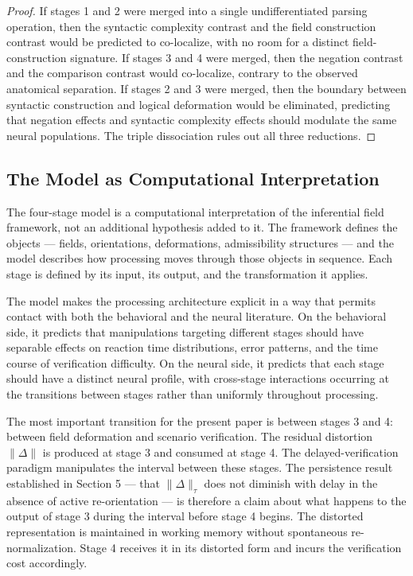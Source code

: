 \documentclass[12pt]{article}
\theoremstyle{remark}
\begin{document}
\begin{proof}
If stages 1 and 2 were merged into a single undifferentiated parsing
operation, then the syntactic complexity contrast and the field
construction contrast would be predicted to co-localize, with no room
for a distinct field-construction signature. If stages 3 and 4 were
merged, then the negation contrast and the comparison contrast would
co-localize, contrary to the observed anatomical separation. If stages
2 and 3 were merged, then the boundary between syntactic construction
and logical deformation would be eliminated, predicting that negation
effects and syntactic complexity effects should modulate the same
neural populations. The triple dissociation rules out all three
reductions.
\end{proof}

\subsection{The Model as Computational Interpretation}

The four-stage model is a computational interpretation of the inferential
field framework, not an additional hypothesis added to it. The framework
defines the objects --- fields, orientations, deformations, admissibility
structures --- and the model describes how processing moves through those
objects in sequence. Each stage is defined by its input, its output, and
the transformation it applies.

The model makes the processing architecture explicit in a way that
permits contact with both the behavioral and the neural literature. On
the behavioral side, it predicts that manipulations targeting different
stages should have separable effects on reaction time distributions,
error patterns, and the time course of verification difficulty. On the
neural side, it predicts that each stage should have a distinct neural
profile, with cross-stage interactions occurring at the transitions
between stages rather than uniformly throughout processing.

The most important transition for the present paper is between stages 3
and 4: between field deformation and scenario verification. The residual
distortion $\|\Delta\|$ is produced at stage 3 and consumed at stage 4.
The delayed-verification paradigm manipulates the interval between these
stages. The persistence result established in Section 5 --- that
$\|\Delta\|_\tau$ does not diminish with delay in the absence of active
re-orientation --- is therefore a claim about what happens to the output
of stage 3 during the interval before stage 4 begins. The distorted
representation is maintained in working memory without spontaneous
re-normalization. Stage 4 receives it in its distorted form and incurs
the verification cost accordingly.
\end{document}
